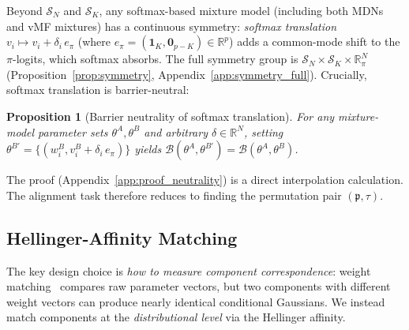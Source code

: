 \documentclass[11pt]{article}
\newtheorem{proposition}[theorem]{Proposition}
\newcommand{\R}{\mathbb{R}}
\newcommand{\cS}{\mathcal{S}}
\newcommand{\cB}{\mathcal{B}}
\newcommand{\nperm}{\mathfrak{p}}  %
\begin{document}
Beyond $\cS_N$ and $\cS_K$, any softmax-based mixture model
(including both MDNs and vMF mixtures) has a continuous symmetry:
\emph{softmax translation}
$v_i \mapsto v_i + \delta_i\, e_\pi$
(where $e_\pi = (\mathbf{1}_K, \mathbf{0}_{p-K}) \in \R^{p}$)
adds a common-mode shift to the $\pi$-logits, which softmax absorbs.
The full symmetry group is
$\cS_N \times \cS_K \times \R^N_\pi$
(Proposition~\ref{prop:symmetry}, Appendix~\ref{app:symmetry_full}).
Crucially, softmax translation is barrier-neutral:

\begin{proposition}[Barrier neutrality of softmax translation]
\label{prop:barrier_neutrality}
For any mixture-model parameter sets $\theta^A, \theta^B$ and arbitrary
$\delta \in \R^N$, setting
$\theta^{B'} = \{(w_i^B, v_i^B + \delta_i\,e_\pi)\}$ yields
$\cB(\theta^A, \theta^{B'}) = \cB(\theta^A, \theta^B)$.
\end{proposition}

\noindent
The proof (Appendix~\ref{app:proof_neutrality}) is a direct
interpolation calculation.
The alignment task therefore reduces to finding the permutation
pair $(\nperm, \tau)$.

\subsection{Hellinger-Affinity Matching}\label{sec:hellinger}

The key design choice is \emph{how to measure component correspondence}:
weight matching~\cite{ainsworth2023} compares raw parameter
vectors, but two components with different weight vectors can produce
nearly identical conditional Gaussians.
We instead match components at the \emph{distributional level} via the
Hellinger affinity.
\end{document}
